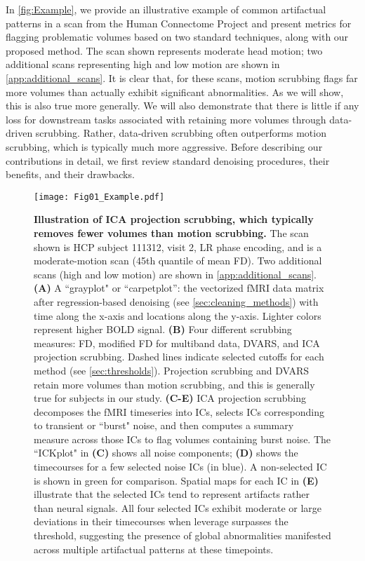 \documentclass{article}
\begin{document}
In \autoref{fig:Example}, we provide an illustrative example of common artifactual patterns in a scan from the Human Connectome Project \citep[HCP,][]{vanessenWUMinnHumanConnectome2013} and present metrics for flagging problematic volumes based on two standard techniques, along with our proposed method. The scan shown represents moderate head motion; two additional scans representing high and low motion are shown in \autoref{app:additional_scans}. It is clear that, for these scans, motion scrubbing flags far more volumes than actually exhibit significant abnormalities. As we will show, this is also true more generally. We will also demonstrate that there is little if any loss for downstream tasks associated with retaining more volumes through data-driven scrubbing. Rather, data-driven scrubbing often outperforms motion scrubbing, which is typically much more aggressive. Before describing our contributions in detail, we first review standard denoising procedures, their benefits, and their drawbacks. 

\begin{figure}
    \centering
    \texttt{[image: Fig01\_Example.pdf]}
    \caption{\small \textbf{Illustration of ICA projection scrubbing, which typically removes fewer volumes than motion scrubbing.} The scan shown is HCP subject 111312, visit 2, LR phase encoding, and is a moderate-motion scan (45th quantile of mean FD). Two additional scans (high and low motion) are shown in \autoref{app:additional_scans}. \textbf{(A)} A ``grayplot" or ``carpetplot'': the vectorized fMRI data matrix after regression-based denoising (see \autoref{sec:cleaning_methods}) with time along the x-axis and locations along the y-axis. Lighter colors represent higher BOLD signal. \textbf{(B)} Four different scrubbing measures: FD, modified FD for multiband data, DVARS, and ICA projection scrubbing. Dashed lines indicate selected cutoffs for each method (see \autoref{sec:thresholds}). Projection scrubbing and DVARS retain more volumes than motion scrubbing, and this is generally true for subjects in our study. \textbf{(C-E)} ICA projection scrubbing decomposes the fMRI timeseries into ICs, selects ICs corresponding to transient or ``burst" noise, and then computes a summary measure across those ICs to flag volumes containing burst noise. The ``ICKplot" in \textbf{(C)} shows all noise components; \textbf{(D)} shows the timecourses for a few selected noise ICs (in blue). A non-selected IC is shown in green for comparison. Spatial maps for each IC in \textbf{(E)} illustrate that the selected ICs tend to represent artifacts rather than neural signals. All four selected ICs exhibit moderate or large deviations in their timecourses when leverage surpasses the threshold, suggesting the presence of global abnormalities manifested across multiple artifactual patterns at these timepoints.}
    \label{fig:Example}
\end{figure}
\end{document}
